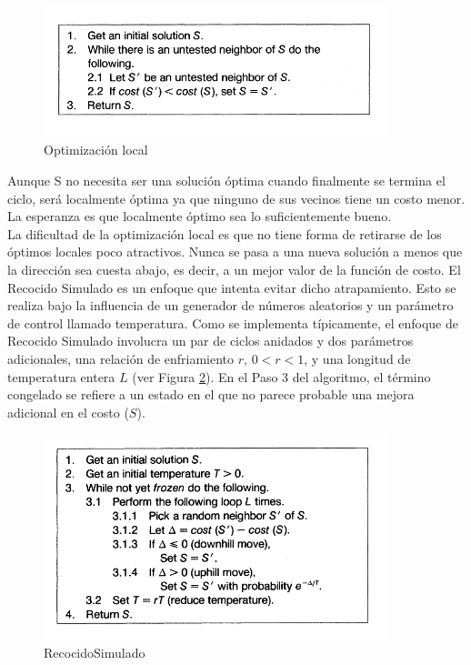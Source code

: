 \documentclass[a4paper,openright,11pt,oneside]{book}
\begin{document}
		\begin{figure}[h]
		\centering
		\includegraphics[width=10cm]{./Graphics/RecocidoSimuladoOptLocal.png}
		\caption{Optimización local}
		\label{OptLocalRS}
		\end{figure}
		
		Aunque S no necesita ser una solución óptima cuando finalmente se termina el ciclo, será localmente óptima ya que ninguno de sus vecinos tiene un costo menor. La esperanza es que localmente óptimo sea lo suficientemente bueno. \\
		
		La dificultad de la optimización local es que no tiene forma de retirarse de los óptimos locales poco atractivos. Nunca se pasa a una nueva solución a menos que la dirección sea cuesta abajo, es decir, a un mejor valor de la función de costo. El Recocido Simulado es un enfoque que intenta evitar dicho atrapamiento. Esto se realiza bajo la influencia de un generador de números aleatorios y un parámetro de control llamado temperatura. Como se implementa típicamente, el enfoque de Recocido Simulado involucra un par de ciclos anidados y dos parámetros adicionales, una relación de enfriamiento $r$, $0 < r <1$, y una longitud de temperatura entera $L$ (ver Figura \ref{RecocidoSimulado}). En el Paso 3 del algoritmo, el término congelado se refiere a un estado en el que no parece probable una mejora adicional en el costo ($S$).
		
		\begin{figure}[h]
		\centering
		\includegraphics[width=10cm]{./Graphics/RecocidoSimulado.png}
		\caption{RecocidoSimulado}
		\label{RecocidoSimulado}
		\end{figure}
		
\end{document}
